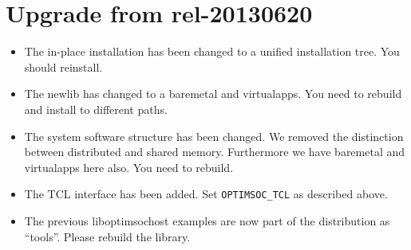 \section{Upgrade from rel-20130620}

\begin{itemize}
\item The in-place installation has been changed to a unified
  installation tree. You should reinstall.
\item The newlib has changed to a baremetal and virtualapps. You need
  to rebuild and install to different paths.
\item The system software structure has been changed. We removed the
  distinction between distributed and shared memory. Furthermore we
  have baremetal and virtualapps here also. You need to rebuild.
\item The TCL interface has been added. Set \verb|OPTIMSOC_TCL| as
  described above.
\item The previous liboptimsochost examples are now part of the
  distribution as ``tools''. Please rebuild the library.
\end{itemize}